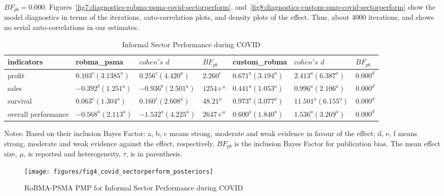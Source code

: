 \documentclass[a4paper, 12pt]{article}
\begin{document}
$BF_{pb} = 0.000$. Figures~\ref{fig7:diagnostics-robma-psma-covid-sectorperform}, and~\ref{fig8:diagnostics-custom-pmp-covid-sectorperform} show the model diagnostics in terms of the iterations, auto-correlation plots, and density plots of the effect. Thus, about $4000$ iterations, and shows no serial auto-correlations in our estimates.

    \begin{landscape}
        \begin{table}
            \centering
            \caption{Informal Sector Performance during COVID}
            \label{tab4:informal-sector-perform-during-covid}
            \begin{tabular}{lllllll}
                \toprule
                indicators          & robma\_psma          & $cohen's$ $d$        & $BF_{pb}$ & custom\_robma       & $cohen's$ $d$        & $BF_{pb}$ \\
                \midrule
                profit              & $0.103^c (3.1385^a)$ & $0.256^c (4.420^a)$  & $2.260^c$ & $0.671^a (3.194^a)$ & $2.413^a (6.387^a)$ & $0.000^d$ \\
                sales               & $-0.392^b (1.251^a)$ & $-0.936^b (2.501^a)$ & $1254+^a$ & $0.441^a (1.053^a)$ & $0.996^a (2.106^a)$ & $0.000^d$ \\
                survival            & $0.063^e (1.304^a)$  & $0.160^c (2.608^a)$  & $48.21^a$ & $0.973^a (3.077^a)$ & $11.501^a (6.155^a)$ & $0.000^d$ \\
                overall performance & $-0.568^a (2.113^a)$ & $-1.532^a (4.225^a)$ & $2647+^a$ & $0.600^a (1.840^a)$ & $1.536^a (3.269^a)$ & $0.000^d$ \\
                \bottomrule
            \end{tabular}
            \begin{minipage}{19cm}
                \vspace{0.1cm}
                \small Notes: Based on their inclusion Bayes Factor: a, b, c means strong, moderate and weak evidence in favour of the effect; d, e, f means strong, moderate and weak evidence against the effect, respectively. $BF_{pb}$ is the inclusion Bayes Factor for publication bias. The mean effect size, $\mu$, is reported and heterogeneity, $\tau$, is in parenthesis.
            \end{minipage}
        \end{table}
    \end{landscape}

    \begin{figure}[H]
        \centering
        \texttt{[image: figures/fig4\_covid\_sectorperform\_posteriors]}
        \caption{RoBMA-PSMA PMP for Informal Sector Performance during COVID}
        \label{fig5:robma-psma-pmp-covid-sectorperform-posteriors}
    \end{figure}
\end{document}
